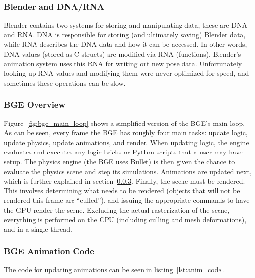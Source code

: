 \subsubsection{Blender and DNA/RNA}
\label{sec:bf_dna_rna}

Blender contains two systems for storing and manipulating data, these are DNA and RNA. DNA is responsible for storing (and ultimately saving) Blender data, while RNA describes the DNA data and how it can be accessed.
In other words, DNA values (stored as C structs) are modified via RNA (functions).
Blender's animation system uses this RNA for writing out new pose data.
Unfortunately looking up RNA values and modifying them were never optimized for speed, and sometimes these operations can be slow.

\subsubsection{BGE Overview}
\label{sec:bge_general_overview}


Figure~\ref{fig:bge_main_loop} shows a simplified version of the BGE's main loop.
As can be seen, every frame the BGE has roughly four main tasks: update logic, update physics, update animations, and render.
When updating logic, the engine evaluates and executes any logic bricks or Python scripts that a user may have setup.
The physics engine (the BGE uses Bullet) is then given the chance to evaluate the physics scene and step its simulations.
Animations are updated next, which is further explained in section~\ref{sec:bge_anim_overview}.
Finally, the scene must be rendered.
This involves determining what needs to be rendered (objects that will not be rendered this frame are ``culled''), and issuing the appropriate commands to have the GPU render the scene.
Excluding the actual rasterization of the scene, everything is performed on the CPU (including culling and mesh deformations), and in a single thread.

\subsubsection{BGE Animation Code}
\label{sec:bge_anim_overview}

The code for updating animations can be seen in listing~\ref{lst:anim_code}.


